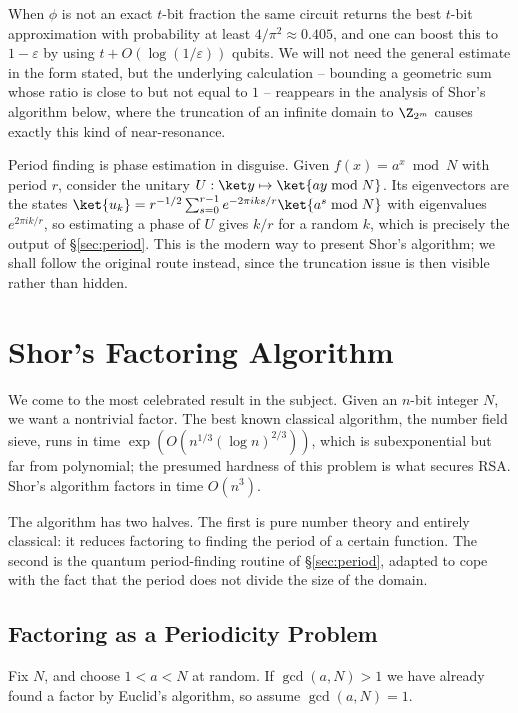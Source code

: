 When $\phi$ is not an exact $t$-bit fraction the same circuit returns the best $t$-bit approximation with probability at least $4/\pi^2\approx0.405$, and one can boost this to $1-\varepsilon$ by using $t+O(\log(1/\varepsilon))$ qubits. We will not need the general estimate in the form stated, but the underlying calculation -- bounding a geometric sum whose ratio is close to but not equal to $1$ -- reappears in the analysis of Shor's algorithm below, where the truncation of an infinite domain to $\Z_{2^m}$ causes exactly this kind of near-resonance.

\begin{remark}
	Period finding is phase estimation in disguise. Given $f(x) = a^x \bmod N$ with period $r$, consider the unitary $U:\ket y\mapsto\ket{ay\bmod N}$. Its eigenvectors are the states $\ket{u_k} = r^{-1/2}\sum_{s=0}^{r-1}e^{-2\pi iks/r}\ket{a^s\bmod N}$ with eigenvalues $e^{2\pi ik/r}$, so estimating a phase of $U$ gives $k/r$ for a random $k$, which is precisely the output of \S\ref{sec:period}. This is the modern way to present Shor's algorithm; we shall follow the original route instead, since the truncation issue is then visible rather than hidden.
\end{remark}

\section{Shor's Factoring Algorithm}\label{sec:shor}

We come to the most celebrated result in the subject. Given an $n$-bit integer $N$, we want a nontrivial factor. The best known classical algorithm, the number field sieve, runs in time $\exp\left(O(n^{1/3}(\log n)^{2/3})\right)$, which is subexponential but far from polynomial; the presumed hardness of this problem is what secures RSA. Shor's algorithm factors in time $O(n^3)$.

The algorithm has two halves. The first is pure number theory and entirely classical: it reduces factoring to finding the period of a certain function. The second is the quantum period-finding routine of \S\ref{sec:period}, adapted to cope with the fact that the period does not divide the size of the domain.

\subsection{Factoring as a Periodicity Problem}

Fix $N$, and choose $1 < a < N$ at random. If $\gcd(a,N)>1$ we have already found a factor by Euclid's algorithm, so assume $\gcd(a,N)=1$.

